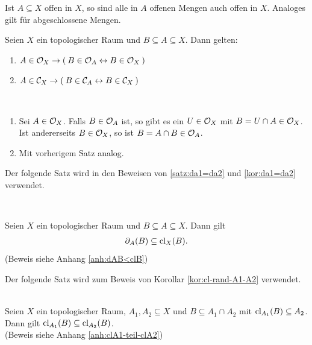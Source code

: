     Ist $A \subseteq X$ offen in $X$, so sind alle in $A$ offenen Mengen auch offen in $X$. Analoges gilt für abgeschlossene Mengen.
    \begin{kor}\label{kor:OX-OA-CX-CA}
        Seien $X$ ein topologischer Raum und $B \subseteq A \subseteq X$. Dann gelten:
        \begin{enumerate}
            \item $A \in \mathcal{O}_X \to (\: B \in \mathcal{O}_A \leftrightarrow B \in \mathcal{O}_X \:)$
            \item $A \in \mathcal{C}_X \to (\: B \in \mathcal{C}_A \leftrightarrow B \in \mathcal{C}_X \:)$
        \end{enumerate}
    \end{kor}
    \begin{bew}\ 
        \begin{enumerate}
            \item Sei $A \in \mathcal{O}_X$. Falls $B \in \mathcal{O}_A$ ist, so gibt es ein $U \in \mathcal{O}_X$ mit $B = U \cap A \in \mathcal{O}_X$.\\
            Ist andererseits $B \in \mathcal{O}_X$, so ist $B = A \cap B \in \mathcal{O}_A$.
            \item Mit vorherigem Satz analog.
        \end{enumerate}
    \end{bew}


    Der folgende Satz wird in den Beweisen von \ref{satz:da1=da2} und \ref{kor:da1=da2} verwendet.
    \begin{satz} \label{satz:dAB<clB}\ \vspace{8pt}

        \noindent
        Seien $X$ ein topologischer Raum und $B \subseteq A \subseteq X$. Dann gilt 
        \begin{align*}
            \partial_A(B) \subseteq \text{cl}_X(B).
        \end{align*}
        (Beweis siehe Anhang \ref{anh:dAB<clB})
    \end{satz}


    Der folgende Satz wird zum Beweis von Korollar \ref{kor:cl-rand-A1-A2} verwendet.
    \begin{satz}\label{satz:clA1-teil-clA2}\ \\
        Seien $X$ ein topologischer Raum, ${A_1, A_2 \subseteq X}$ und ${B \subseteq A_1 \cap A_2}$ mit ${\text{cl}_{A_1}(B) \subseteq A_2}$. Dann gilt ${\text{cl}_{A_1}(B) \subseteq \text{cl}_{A_2}(B)}$.\\
        (Beweis siehe Anhang \ref{anh:clA1-teil-clA2})
    \end{satz}


